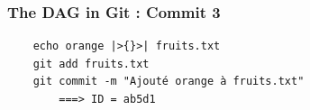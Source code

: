 \documentclass[table,tikz,12pt,svgnames]{beamer}
\begin{document}
\begin{frame}[fragile]
\frametitle{The DAG in Git : Commit 3}

	\begin{figure}
		\begin{subfigure}[h]{\textwidth}
		\end{subfigure}
	\end{figure}

\begin{block}{}%
	\vspace{0.4cm} \begin{center} \noindent{} \end{center} \vspace{-0.4cm} 		
	\begin{verbatim}
	echo orange |>{}>| fruits.txt
	git add fruits.txt
	git commit -m "Ajouté orange à fruits.txt"
		===> ID = ab5d1
	\end{verbatim}
\end{block}
\end{frame}
\end{document}
